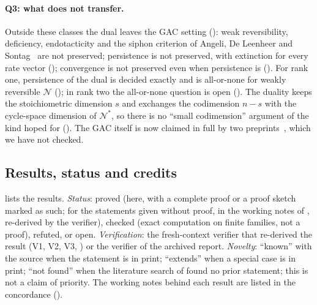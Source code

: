 \documentclass[11pt,a4paper]{report}
\newcommand{\Net}{\mathcal{N}}
\newcommand{\Nd}{\mathcal{N}^{*}}
\begin{document}
\paragraph{Q3: what does not transfer.} Outside these classes the dual leaves the GAC setting
(): weak reversibility, deficiency, endotacticity and the siphon criterion of Angeli, De
Leenheer and Sontag~\autocite{AngeliDeLeenheerSontag2007} are not preserved; persistence is not preserved, with
extinction for every rate vector (); convergence is not preserved even when
persistence is (). For rank one, persistence of the dual is decided exactly and is all-or-none for
weakly reversible \(\Net\) (); in rank two the all-or-none question is open
(). The duality keeps the stoichiometric dimension \(s\) and exchanges the codimension \(n-s\)
with the cycle-space dimension of \(\Nd\), so there is no ``small codimension'' argument of the kind hoped for
(). The GAC itself is now claimed in full by two preprints~\autocite{Craciun2015GAC,OpenAI2026persistence},
which we have not checked.

\subsection{Results, status and credits}

 lists the results. \emph{Status}: proved (here, with a complete proof or a proof sketch
marked as such; for the statements given without proof, in the working notes of , re-derived by
the verifier), checked (exact computation on finite families, not a proof), refuted, or open.
\emph{Verification}: the fresh-context verifier that re-derived the result (V1, V2, V3, ) or
the verifier of the archived report. \emph{Novelty}: ``known'' with the source when the statement is in print;
``extends'' when a special case is in print; ``not found'' when the literature search of  found no
prior statement; this is not a claim of priority. The working notes behind each result are listed in the
concordance ().
\end{document}
